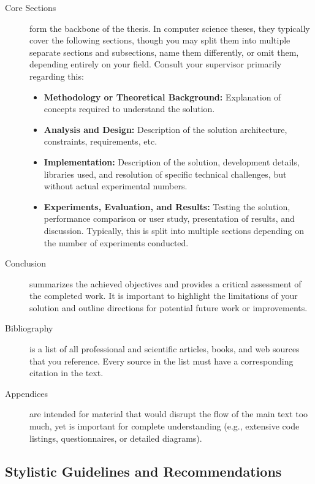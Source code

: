 \documentclass[9pt]{style/friteza}
\begin{document}
\begin{description}
    \item[Core Sections] form the backbone of the thesis. In computer science theses, they typically cover the following sections, though you may split them into multiple separate sections and subsections, name them differently, or omit them, depending entirely on your field. Consult your supervisor primarily regarding this:
    \begin{itemize}
        \item \textbf{Methodology or Theoretical Background:} Explanation of concepts required to understand the solution.
        \item \textbf{Analysis and Design:} Description of the solution architecture, constraints, requirements, etc.
        \item \textbf{Implementation:} Description of the solution, development details, libraries used, and resolution of specific technical challenges, but without actual experimental numbers.
        \item \textbf{Experiments, Evaluation, and Results:} Testing the solution, performance comparison or user study, presentation of results, and discussion. Typically, this is split into multiple sections depending on the number of experiments conducted.
    \end{itemize}
    
    \item[Conclusion] summarizes the achieved objectives and provides a critical assessment of the completed work. It is important to highlight the limitations of your solution and outline directions for potential future work or improvements.
    
    \item[Bibliography] is a list of all professional and scientific articles, books, and web sources that you reference. Every source in the list must have a corresponding citation in the text.
    
    \item[Appendices] are intended for material that would disrupt the flow of the main text too much, yet is important for complete understanding (e.g., extensive code listings, questionnaires, or detailed diagrams).
\end{description}

\subsection{Stylistic Guidelines and Recommendations}
\end{document}
